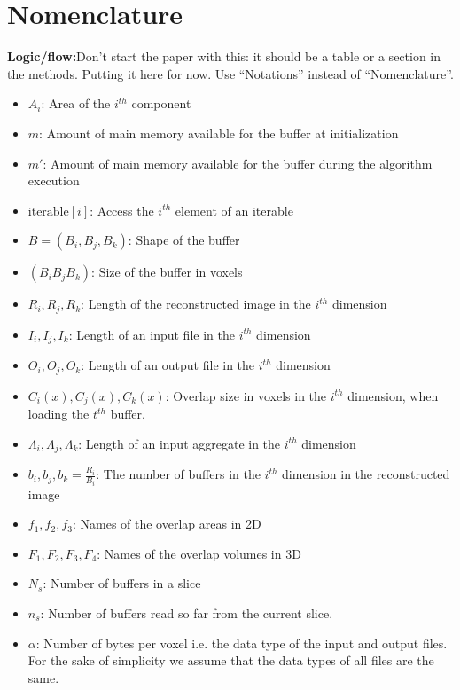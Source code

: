 \documentclass[conference]{IEEEtran}
\newcommand{\logic}[1]{\color{red}\textbf{Logic/flow:}#1\color{black}}
\begin{document}
\section{Nomenclature}
\logic{Don't start the paper with this: it should be a table or a section in the methods. Putting it here for now.
Use ``Notations'' instead of ``Nomenclature''.}
\begin{itemize}
  \item $A_i$: Area of the $i^{th}$ component
  \item $m$: Amount of main memory available for the buffer at initialization
  \item $m'$: Amount of main memory available for the buffer during the algorithm execution
  \item $\textrm{iterable}[i]$: Access the $i^{th}$ element of an iterable
  \item $B = (B_i, B_j, B_k)$: Shape of the buffer
  \item $(B_i B_j B_k)$: Size of the buffer in voxels
  \item $R_i, R_j, R_k$: Length of the reconstructed image in the $i^{th}$ dimension
  \item $I_i, I_j, I_k$: Length of an input file in the $i^{th}$ dimension
  \item $O_i, O_j, O_k$: Length of an output file in the $i^{th}$ dimension
  \item $C_i(x), C_j(x), C_k(x)$: Overlap size in voxels in the $i^{th}$ dimension, when loading the $t^{th}$ buffer.
  \item $\Lambda_i, \Lambda_j, \Lambda_k$: Length of an input aggregate in the $i^{th}$ dimension
  \item $b_i, b_j, b_k = \frac{R_i}{B_i}$: The number of buffers in the $i^{th}$ dimension in the reconstructed image
  \item $f_1, f_2, f_3$: Names of the overlap areas in 2D
  \item $F_1, F_2, F_3, F_4$: Names of the overlap volumes in 3D
  \item $ N_s $: Number of buffers in a slice
  \item $ n_s $: Number of buffers read so far from the current slice.
  \item $\alpha$: Number of bytes per voxel i.e. the data type of the input and output files. For the sake of simplicity we assume that the data types of all files are the same.
\end{itemize}
\end{document}
